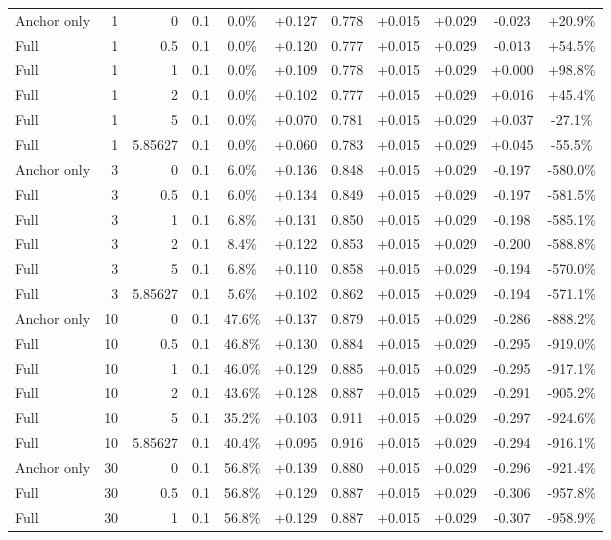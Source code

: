 \begin{table}[htbp]
\begin{tabular}{lrrrccccccc}
Anchor only & 1 & 0 & 0.1 & 0.0\% & +0.127 & 0.778 & +0.015 & +0.029 & -0.023 & +20.9\% \\
Full & 1 & 0.5 & 0.1 & 0.0\% & +0.120 & 0.777 & +0.015 & +0.029 & -0.013 & +54.5\% \\
Full & 1 & 1 & 0.1 & 0.0\% & +0.109 & 0.778 & +0.015 & +0.029 & +0.000 & +98.8\% \\
Full & 1 & 2 & 0.1 & 0.0\% & +0.102 & 0.777 & +0.015 & +0.029 & +0.016 & +45.4\% \\
Full & 1 & 5 & 0.1 & 0.0\% & +0.070 & 0.781 & +0.015 & +0.029 & +0.037 & -27.1\% \\
Full & 1 & 5.85627 & 0.1 & 0.0\% & +0.060 & 0.783 & +0.015 & +0.029 & +0.045 & -55.5\% \\
Anchor only & 3 & 0 & 0.1 & 6.0\% & +0.136 & 0.848 & +0.015 & +0.029 & -0.197 & -580.0\% \\
Full & 3 & 0.5 & 0.1 & 6.0\% & +0.134 & 0.849 & +0.015 & +0.029 & -0.197 & -581.5\% \\
Full & 3 & 1 & 0.1 & 6.8\% & +0.131 & 0.850 & +0.015 & +0.029 & -0.198 & -585.1\% \\
Full & 3 & 2 & 0.1 & 8.4\% & +0.122 & 0.853 & +0.015 & +0.029 & -0.200 & -588.8\% \\
Full & 3 & 5 & 0.1 & 6.8\% & +0.110 & 0.858 & +0.015 & +0.029 & -0.194 & -570.0\% \\
Full & 3 & 5.85627 & 0.1 & 5.6\% & +0.102 & 0.862 & +0.015 & +0.029 & -0.194 & -571.1\% \\
Anchor only & 10 & 0 & 0.1 & 47.6\% & +0.137 & 0.879 & +0.015 & +0.029 & -0.286 & -888.2\% \\
Full & 10 & 0.5 & 0.1 & 46.8\% & +0.130 & 0.884 & +0.015 & +0.029 & -0.295 & -919.0\% \\
Full & 10 & 1 & 0.1 & 46.0\% & +0.129 & 0.885 & +0.015 & +0.029 & -0.295 & -917.1\% \\
Full & 10 & 2 & 0.1 & 43.6\% & +0.128 & 0.887 & +0.015 & +0.029 & -0.291 & -905.2\% \\
Full & 10 & 5 & 0.1 & 35.2\% & +0.103 & 0.911 & +0.015 & +0.029 & -0.297 & -924.6\% \\
Full & 10 & 5.85627 & 0.1 & 40.4\% & +0.095 & 0.916 & +0.015 & +0.029 & -0.294 & -916.1\% \\
Anchor only & 30 & 0 & 0.1 & 56.8\% & +0.139 & 0.880 & +0.015 & +0.029 & -0.296 & -921.4\% \\
Full & 30 & 0.5 & 0.1 & 56.8\% & +0.129 & 0.887 & +0.015 & +0.029 & -0.306 & -957.8\% \\
Full & 30 & 1 & 0.1 & 56.8\% & +0.129 & 0.887 & +0.015 & +0.029 & -0.307 & -958.9\% \\

\end{tabular}
\end{table}
